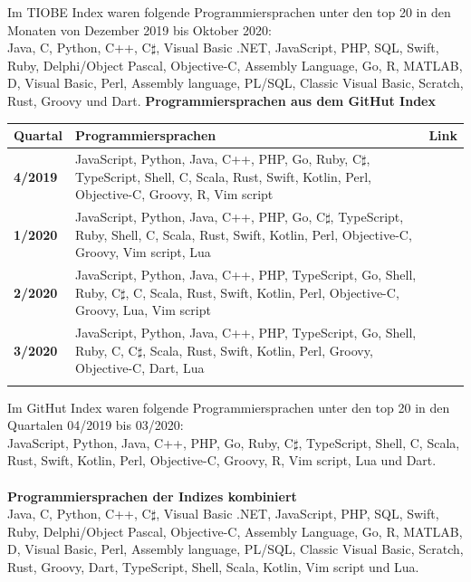 \documentclass[ngerman]{article}
\begin{document}
    Im TIOBE Index waren folgende Programmiersprachen unter den top 20 in den Monaten von Dezember 2019 bis Oktober 2020:\\
    Java, C, Python, C++, C$\sharp$, Visual Basic .NET, JavaScript, PHP, SQL, Swift, Ruby, Delphi/Object Pascal, Objective-C, Assembly Language, Go, R, MATLAB, D, Visual Basic, Perl, Assembly language, PL/SQL, Classic Visual Basic, Scratch, Rust, Groovy und Dart.
    \textbf{Programmiersprachen aus dem GitHut Index}\\
    \label{GrundlagenLanguageGitHut}
    \begin{tabularx}{\textwidth}{|l|X|c|}
        \hline
        \textbf{Quartal}&\textbf{Programmiersprachen}&\textbf{Link}\\
        \hline
        \textbf{4/2019}&JavaScript, Python, Java, C++, PHP, Go, Ruby, C$\sharp$, TypeScript, Shell, C, Scala, Rust, Swift, Kotlin, Perl, Objective-C, Groovy, R, Vim script&\cite{GitHut 2.0 4/2019}\\
        \hline
        \textbf{1/2020}&JavaScript, Python, Java, C++, PHP, Go, C$\sharp$, TypeScript, Ruby, Shell, C, Scala, Rust, Swift, Kotlin, Perl, Objective-C, Groovy, Vim script, Lua&\cite{GitHut 2.0 1/2020}\\
        \hline
        \textbf{2/2020}&JavaScript, Python, Java, C++, PHP, TypeScript, Go, Shell, Ruby, C$\sharp$, C, Scala, Rust, Swift, Kotlin, Perl, Objective-C, Groovy, Lua, Vim script&\cite{GitHut 2.0 2/2020}\\
        \hline
        \textbf{3/2020}&JavaScript, Python, Java, C++, PHP, TypeScript, Go, Shell, Ruby, C, C$\sharp$, Scala, Rust, Swift, Kotlin, Perl, Groovy, Objective-C, Dart, Lua&\cite{GitHut 2.0 3/2020}\\
        \hline
        \multicolumn{3}{c}{}
    \end{tabularx}
    Im GitHut Index waren folgende Programmiersprachen unter den top 20 in den Quartalen 04/2019 bis 03/2020:\\
    JavaScript, Python, Java, C++, PHP, Go, Ruby, C$\sharp$, TypeScript, Shell, C, Scala, Rust, Swift, Kotlin, Perl, Objective-C, Groovy, R, Vim script, Lua und Dart.\\\\
    \textbf{Programmiersprachen der Indizes kombiniert}\\
    \label{GrundlagenLanguageCombined}
    Java, C, Python, C++, C$\sharp$, Visual Basic .NET, JavaScript, PHP, SQL, Swift, Ruby, Delphi/Object Pascal, Objective-C, Assembly Language, Go, R, MATLAB, D, Visual Basic, Perl, Assembly language, PL/SQL, Classic Visual Basic, Scratch, Rust, Groovy, Dart, TypeScript, Shell, Scala, Kotlin, Vim script und Lua.
\end{document}
